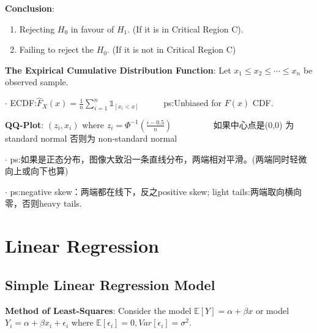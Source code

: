 \documentclass[9pt]{article}
\begin{document}
    \textbf{Conclusion}:
    \begin{enumerate}[itemsep=-2pt, topsep=-2pt]
        \item Rejecting $H_0$ in favour of $H_1$. (If it is in Critical Region C).
        \item Failing to reject the $H_0$. (If it is not in Critical Region C)
    \end{enumerate}

    \textbf{The Expirical Cumulative Distribution Function}: Let $x_1\leq x_2\leq \cdots\leq x_n$ be observed sample.

$\cdot$ ECDF:$\hat{F}_X(x)=\frac{1}{n}\sum_{i=1}^{n}\mathbb{1}_{[x_i<x]}$ \ \ \ \ \ ps:Unbiased for $F(x)$ CDF.

    \textbf{QQ-Plot}: $(z_i,x_i)$ where $z_i=\Phi^{-1}(\frac{i-0.5}{n})$ \ \ \ \ \ \ \ \ \ {\small 如果中心点是(0,0) 为 standard normal 否则为 non-standard normal}

$\cdot$ ps:如果是正态分布，图像大致沿一条直线分布，两端相对平滑。(两端同时轻微向上或向下也算)

$\cdot$ ps:negative skew：两端都在线下，反之positive skew; light tails:两端取向横向零，否则heavy tails.

    \section{Linear Regression} %

    \subsection{Simple Linear Regression Model}

    \textbf{Method of Least-Squares}: Consider the model $\mathbb{E}[Y]=\alpha +\beta x$ or model $Y_i=\alpha + \beta x_i + \epsilon_i$ where $\mathbb{E}[\epsilon_i]=0,Var[\epsilon_i]=\sigma^2$.
\end{document}
